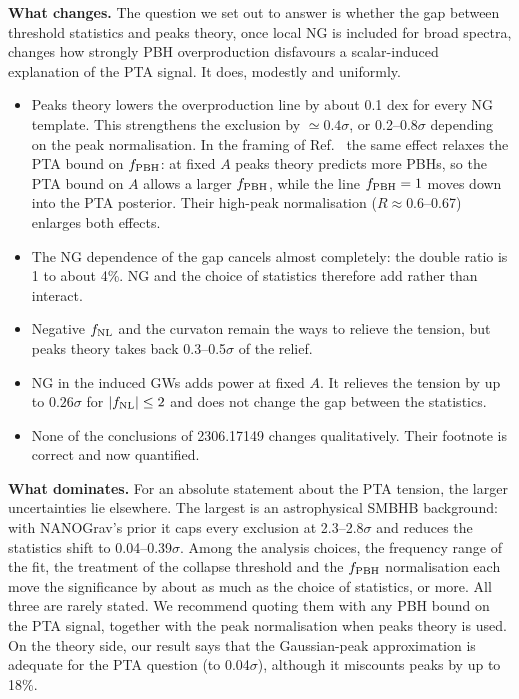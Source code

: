 \documentclass[11pt,a4paper]{article}
\newcommand{\fnl}{f_{\rm NL}}
\newcommand{\fpbh}{f_{\rm PBH}}
\begin{document}
\textbf{What changes.} The question we set out to answer is whether the gap between threshold
statistics and peaks theory, once local NG is included for broad spectra, changes how strongly
PBH overproduction disfavours a scalar-induced explanation of the PTA signal. It does, modestly
and uniformly.
\begin{itemize}
\item Peaks theory lowers the overproduction line by about 0.1 dex for every NG template. This
strengthens the exclusion by $\simeq0.4\sigma$, or 0.2--0.8$\sigma$ depending on the peak
normalisation. In the framing of Ref.~\cite{Iovino24} the same effect relaxes the PTA bound on
$\fpbh$: at fixed $A$ peaks theory predicts more PBHs, so the PTA bound on $A$ allows a larger
$\fpbh$, while the line $\fpbh=1$ moves down into the PTA posterior. Their high-peak
normalisation ($R\approx0.6$--0.67) enlarges both effects.
\item The NG dependence of the gap cancels almost completely: the double ratio is 1 to about 4\%.
NG and the choice of statistics therefore add rather than interact.
\item Negative $\fnl$ and the curvaton remain the ways to relieve the tension, but peaks theory
takes back 0.3--0.5$\sigma$ of the relief.
\item NG in the induced GWs adds power at fixed $A$. It relieves the tension by up to
$0.26\sigma$ for $|\fnl|\le2$ and does not change the gap between the statistics.
\item None of the conclusions of 2306.17149 changes qualitatively. Their footnote is correct and
now quantified.
\end{itemize}

\textbf{What dominates.} For an absolute statement about the PTA tension, the larger
uncertainties lie elsewhere. The largest is an astrophysical SMBHB background: with NANOGrav's
prior it caps every exclusion at 2.3--2.8$\sigma$ and reduces the statistics shift to
0.04--0.39$\sigma$. Among the analysis choices, the frequency range of the fit, the treatment of the collapse
threshold and the $\fpbh$ normalisation each move the significance by about as much as the choice
of statistics, or more. All three are rarely stated. We recommend quoting them with any PBH
bound on the PTA signal, together with the peak normalisation when peaks theory is used. On the
theory side, our result says that the Gaussian-peak approximation is adequate for the PTA
question (to 0.04$\sigma$), although it miscounts peaks by up to 18\%.
\end{document}
